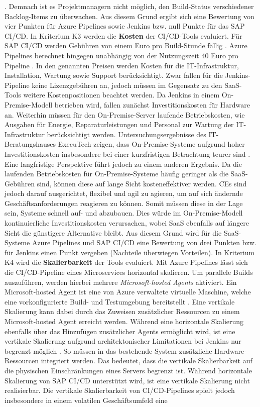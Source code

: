 \cite[Z. 101 ff.]{TestDeveloperSAPHyperspaceAdoption&Onboarding.}. Demnach ist es Projektmanagern nicht möglich, den Build-Status verschiedener Backlog-Items zu überwachen. Aus diesem Grund ergibt sich eine Bewertung von vier Punkten für Azure Pipelines sowie Jenkins bzw. null Punkte für das SAP CI/CD. In Kriterium K3 werden die \textbf{Kosten} der CI/CD-Tools evaluiert. Für SAP CI/CD werden Gebühren von einem Euro pro Build-Stunde fällig \cite[Z. 107 ff.]{ProductOwnerSAPBTPProd&Infra.}. Azure Pipelines berechnet hingegen unabhängig von der Nutzungszeit 40 Euro pro Pipeline \cite{.20230410}. In den genannten Preisen werden Kosten für die IT-Infrastruktur, Installation, Wartung sowie Support berücksichtigt. Zwar fallen für die Jenkins-Pipeline keine Lizenzgebühren an, jedoch müssen im Gegensatz zu den SaaS-Tools weitere Kostenpositionen beachtet werden. Da Jenkins in einem On-Premise-Modell betrieben wird, fallen zunächst Investitionskosten für Hardware an. Weiterhin müssen für den On-Premise-Server laufende Betriebskosten, wie Ausgaben für Energie, Reparaturleistungen und Personal zur Wartung der IT-Infrastruktur berücksichtigt werden. Untersuchungsergebnisse des IT-Beratungshauses ExecuTech zeigen, dass On-Premise-Systeme aufgrund hoher Investitionskosten insbesondere bei einer kurzfristigen Betrachtung teurer sind \cite{Executech.20230308}. Eine langfristige Perspektive führt jedoch zu einem anderen Ergebnis. Da die laufenden Betriebskosten für On-Premise-Systeme häufig geringer als die SaaS-Gebühren sind, können diese auf lange Sicht kosteneffektiver werden. CEs sind jedoch darauf ausgerichtet, flexibel und agil zu agieren, um auf sich ändernde Geschäftsanforderungen reagieren zu können. Somit müssen diese in der Lage sein, Systeme schnell auf- und abzubauen. Dies würde im On-Premise-Modell kontinuierliche Investitionskosten verursachen, wobei SaaS ebenfalls auf längere Sicht die günstigere Alternative bleibt. Aus diesem Grund wird für die SaaS-Systeme Azure Pipelines und SAP CI/CD eine Bewertung von drei Punkten bzw. für Jenkins einen Punkt vergeben (Nachteile überwiegen Vorteilen). In Kriterium K4 wird die \textbf{Skalierbarkeit} der Tools evaluiert. Mit Azure Pipelines lässt sich die CI/CD-Pipeline eines Microservices horizontal skalieren. Um parallele Builds auszuführen, werden hierbei mehrere \textit{Microsoft-hosted Agents} aktiviert. Ein Microsoft-hosted Agent ist eine von Azure verwaltete virtuelle Maschine, welche eine vorkonfigurierte Build- und Testumgebung bereitstellt \cite{Steved0x.20230410b}. Eine vertikale Skalierung kann dabei durch das Zuweisen zusätzlicher Ressourcen zu einem Microsoft-hosted Agent erreicht werden. Während eine horizontale Skalierung ebenfalls über das Hinzufügen zusätzlicher Agents ermöglicht wird, ist eine vertikale Skalierung aufgrund architektonischer Limitationen bei Jenkins nur begrenzt möglich \cite{.20230410b}. So müssen in das bestehende System zusätzliche Hardware-Ressourcen integriert werden. Das bedeutet, dass die vertikale Skalierbarkeit auf die physischen Einschränkungen eines Servers begrenzt ist. Während horizontale Skalierung von SAP CI/CD unterstützt wird, ist eine vertikale Skalierung nicht realisierbar. Die vertikale Skalierbarkeit von CI/CD-Pipelines spielt jedoch insbesondere in einem volatilen Geschäftsumfeld eine 